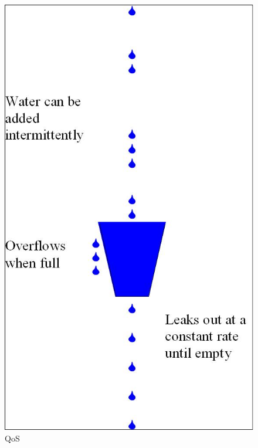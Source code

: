 \documentclass[]{beamer}
\begin{document}
\begin{frame}
  \begin{figure}[hbtp]
   \caption{QoS}
   \begin{center}
    \includegraphics[scale=0.23]{leakybucket.jpg}
   \end{center}
  \end{figure}
\end{frame}
\end{document}
